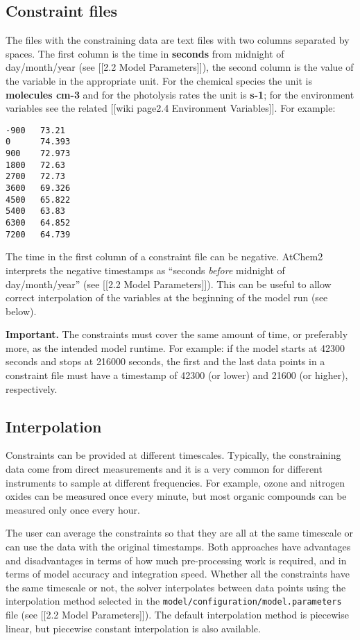 \subsection{Constraint files} \label{constraint-files}

The files with the constraining data are text files with two columns
separated by spaces. The first column is the time in \textbf{seconds}
from midnight of day/month/year (see {[}{[}2.2 Model Parameters{]}{]}),
the second column is the value of the variable in the appropriate unit.
For the chemical species the unit is \textbf{molecules cm-3} and for the
photolysis rates the unit is \textbf{s-1}; for the environment variables
see the related {[}{[}wiki page\textbar{}2.4 Environment
Variables{]}{]}. For example:

\begin{verbatim}
-900   73.21
0      74.393
900    72.973
1800   72.63
2700   72.73
3600   69.326
4500   65.822
5400   63.83
6300   64.852
7200   64.739
\end{verbatim}

The time in the first column of a constraint file can be negative.
AtChem2 interprets the negative timestamps as ``seconds \emph{before}
midnight of day/month/year'' (see {[}{[}2.2 Model Parameters{]}{]}).
This can be useful to allow correct interpolation of the variables at
the beginning of the model run (see below).

\textbf{Important.} The constraints must cover the same amount of time,
or preferably more, as the intended model runtime. For example: if the
model starts at 42300 seconds and stops at 216000 seconds, the first and
the last data points in a constraint file must have a timestamp of 42300
(or lower) and 21600 (or higher), respectively.

\subsection{Interpolation} \label{interpolation}

Constraints can be provided at different timescales. Typically, the
constraining data come from direct measurements and it is a very common
for different instruments to sample at different frequencies. For
example, ozone and nitrogen oxides can be measured once every minute,
but most organic compounds can be measured only once every hour.

The user can average the constraints so that they are all at the same
timescale or can use the data with the original timestamps. Both
approaches have advantages and disadvantages in terms of how much
pre-processing work is required, and in terms of model accuracy and
integration speed. Whether all the constraints have the same timescale
or not, the solver interpolates between data points using the
interpolation method selected in the
\texttt{model/configuration/model.parameters} file (see {[}{[}2.2 Model
Parameters{]}{]}). The default interpolation method is piecewise linear,
but piecewise constant interpolation is also available.

